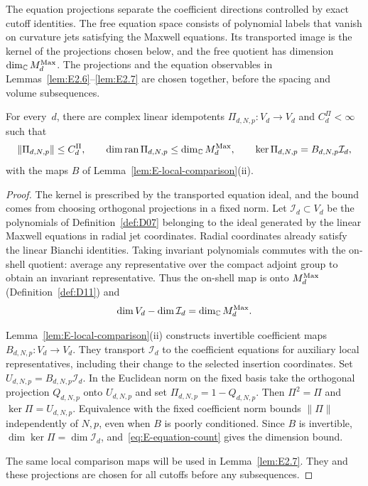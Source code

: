 The equation projections separate the coefficient directions controlled by exact cutoff identities. The free equation space consists of polynomial labels that vanish on curvature jets satisfying the Maxwell equations. Its transported image is the kernel of the projections chosen below, and the free quotient has dimension~$\dim_{\mathbb{C}}M_{d}^{\mathrm{Max}}$. The projections and the equation observables in Lemmas~\ref{lem:E2.6}--\ref{lem:E2.7} are chosen together, before the spacing and volume subsequences.
\begin{lemma}\label{lem:E2.6}
For every~$d$, there are complex linear idempotents $\Pi_{d,N,p}:V_d\to V_d$ and $C^\Pi_d<\infty$ such that
\begin{equation*}
\|\Pi_{d,N,p}\|\le C^\Pi_d,\qquad
\dim\operatorname{ran}\Pi_{d,N,p}\le\dim_{\mathbb{C}}M_{d}^{\mathrm{Max}},\qquad
\ker\Pi_{d,N,p}=B_{d,N,p}\mathcal I_d,
\end{equation*}
with the maps $B$ of Lemma~\ref{lem:E-local-comparison}(ii).
\end{lemma}
\begin{proof}
The kernel is prescribed by the transported equation ideal, and the bound comes from choosing orthogonal projections in a fixed norm. Let $\mathcal I_d\subset V_d$ be the polynomials of Definition~\ref{def:D07} belonging to the ideal generated by the linear Maxwell equations in radial jet coordinates. Radial coordinates already satisfy the linear Bianchi identities. Taking invariant polynomials commutes with the on-shell quotient: average any representative over the compact adjoint group to obtain an invariant representative. Thus the on-shell map is onto $M_{d}^{\mathrm{Max}}$ (Definition~\ref{def:D11}) and
\begin{equation}\label{eq:E-equation-count}
\dim V_d-\dim\mathcal I_d=\dim_{\mathbb{C}}M_{d}^{\mathrm{Max}}.
\end{equation}

Lemma~\ref{lem:E-local-comparison}(ii) constructs invertible coefficient maps $B_{d,N,p}:V_d\to V_d$. They transport $\mathcal I_d$ to the coefficient equations for auxiliary local representatives, including their change to the selected insertion coordinates. Set $U_{d,N,p}=B_{d,N,p}\mathcal I_d$. In the Euclidean norm on the fixed basis take the orthogonal projection $Q_{d,N,p}$ onto $U_{d,N,p}$ and set $\Pi_{d,N,p}=1-Q_{d,N,p}$. Then $\Pi^2=\Pi$ and $\ker\Pi=U_{d,N,p}$. Equivalence with the fixed coefficient norm bounds $\|\Pi\|$ independently of $N,p$, even when $B$ is poorly conditioned. Since $B$ is invertible, $\dim\ker\Pi=\dim\mathcal I_d$, and~\eqref{eq:E-equation-count} gives the dimension bound.

The same local comparison maps will be used in Lemma~\ref{lem:E2.7}. They and these projections are chosen for all cutoffs before any subsequences.
\end{proof}

